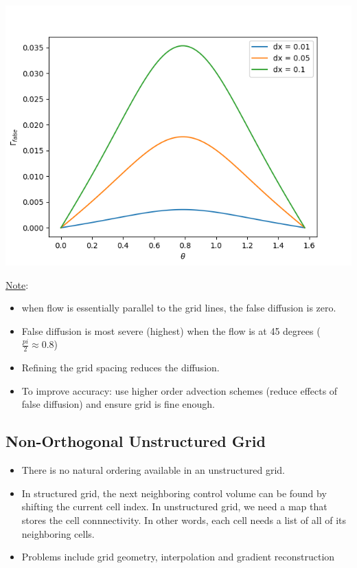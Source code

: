 \documentclass[11pt]{article}
\begin{document}
\begin{center}
\includegraphics[scale=0.8]{../pic/false_diffusion2D.png}
\end{center}
\uline{Note}:
\begin{itemize}
\item when flow is essentially parallel to the grid lines, the false diffusion is zero.
\item False diffusion is most severe (highest) when the flow is at 45 degrees (\(\frac{pi}{2} \approx 0.8\))
\item Refining the grid spacing reduces the diffusion.
\item To improve accuracy: use higher order advection schemes (reduce effects of false diffusion) and ensure
grid is fine enough.
\end{itemize}
\subsection{Non-Orthogonal Unstructured Grid}
\label{sec:org21e1b92}
\begin{itemize}
\item There is no natural ordering available in an unstructured grid.
\item In structured grid, the next neighboring control volume can be found by shifting the current cell
index.  In unstructured grid, we need a map that stores the cell connnectivity. In other words, each cell
needs a list of all of its neighboring cells.
\item Problems include grid geometry, interpolation and gradient reconstruction
\end{itemize}
\end{document}
